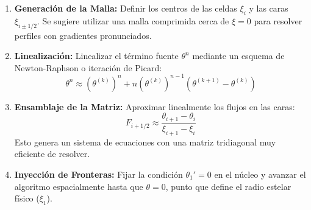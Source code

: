 \documentclass[11pt, lettersize]{article}
\begin{document}
	\begin{enumerate}
		\item \textbf{Generación de la Malla:} Definir los centros de las celdas $\xi_i$ y las caras $\xi_{i\pm1/2}$. Se sugiere utilizar una malla comprimida cerca de $\xi=0$ para resolver perfiles con gradientes pronunciados.
		\item \textbf{Linealización:} Linealizar el término fuente $\theta^n$ mediante un esquema de Newton-Raphson o iteración de Picard:
		\begin{equation}
			\theta^{n} \approx (\theta^{(k)})^n + n(\theta^{(k)})^{n-1}(\theta^{(k+1)} - \theta^{(k)})
		\end{equation}
		\item \textbf{Ensamblaje de la Matriz:} Aproximar linealmente los flujos en las caras:
		\begin{equation}
			F_{i+1/2} \approx \frac{\theta_{i+1} - \theta_i}{\xi_{i+1} - \xi_i}
		\end{equation}
		Esto genera un sistema de ecuaciones con una matriz tridiagonal muy eficiente de resolver.
		\item \textbf{Inyección de Fronteras:} Fijar la condición $\theta_1' = 0$ en el núcleo y avanzar el algoritmo espacialmente hasta que $\theta = 0$, punto que define el radio estelar físico ($\xi_1$).
	\end{enumerate}
	
\end{document}
